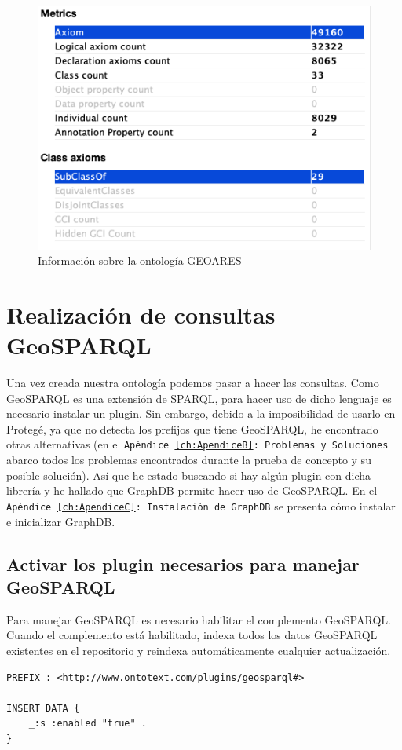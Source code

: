 \begin{figure}[H]
	\centering
	\includegraphics[width=0.6\linewidth]{imagenes/capitulo5/info-ontologia}
	\caption{Información sobre la ontología GEOARES}
	\label{fig:info-ontologia}
\end{figure}

\section{Realización de consultas GeoSPARQL}

\label{ch:consultas}

Una vez creada nuestra ontología podemos pasar a hacer las consultas. Como GeoSPARQL es una extensión de SPARQL, para hacer uso de dicho lenguaje es necesario instalar un plugin.  Sin embargo, debido a la imposibilidad de usarlo en Protegé, ya que no detecta los prefijos que tiene GeoSPARQL, he encontrado otras alternativas (en el \texttt{Apéndice \ref{ch:ApendiceB}: Problemas y Soluciones} abarco todos los problemas encontrados durante la prueba de concepto y su posible solución). Así que he estado buscando si hay algún plugin con dicha librería y he hallado que GraphDB permite hacer uso de GeoSPARQL. En el \texttt{Apéndice \ref{ch:ApendiceC}: Instalación de GraphDB} se presenta cómo instalar e inicializar GraphDB.


\subsection{Activar los plugin necesarios para manejar GeoSPARQL}

Para manejar GeoSPARQL es necesario habilitar el complemento GeoSPARQL. Cuando el complemento está habilitado, indexa todos los datos GeoSPARQL existentes en el repositorio y reindexa automáticamente cualquier actualización.

\vspace*{0.2cm}

\begin{lstlisting}
PREFIX : <http://www.ontotext.com/plugins/geosparql#>

INSERT DATA {
	_:s :enabled "true" .
}
\end{lstlisting}

